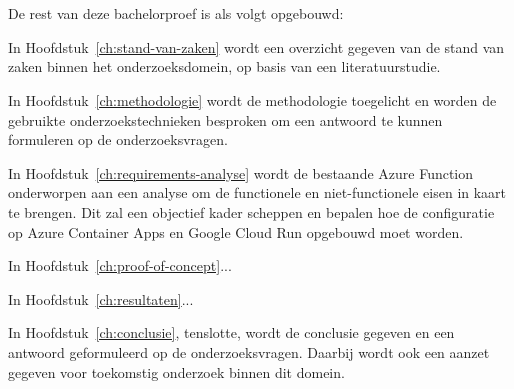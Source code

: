 \section{}%
\label{sec:opzet-bachelorproef}


De rest van deze bachelorproef is als volgt opgebouwd:

In Hoofdstuk~\ref{ch:stand-van-zaken} wordt een overzicht gegeven van de stand van zaken binnen het onderzoeksdomein, op basis van een literatuurstudie.

In Hoofdstuk~\ref{ch:methodologie} wordt de methodologie toegelicht en worden de gebruikte onderzoekstechnieken besproken om een antwoord te kunnen formuleren op de onderzoeksvragen.


In Hoofdstuk~\ref{ch:requirements-analyse} wordt de bestaande Azure Function onderworpen aan een analyse om de functionele en niet-functionele eisen in kaart te brengen. Dit zal een objectief kader scheppen en bepalen hoe de configuratie op Azure Container Apps en Google Cloud Run opgebouwd moet worden.

In Hoofdstuk~\ref{ch:proof-of-concept}...

In Hoofdstuk~\ref{ch:resultaten}...

In Hoofdstuk~\ref{ch:conclusie}, tenslotte, wordt de conclusie gegeven en een antwoord geformuleerd op de onderzoeksvragen. Daarbij wordt ook een aanzet gegeven voor toekomstig onderzoek binnen dit domein.